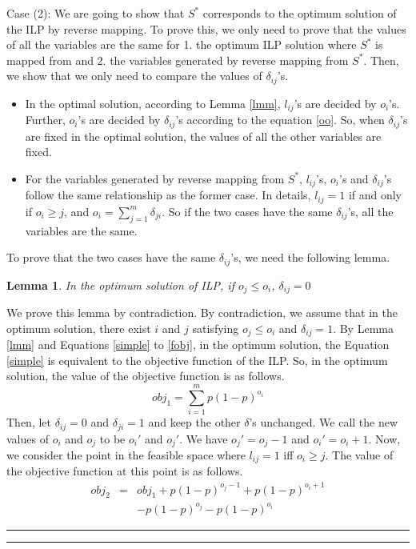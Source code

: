 \documentclass[letterpaper]{article}
\newenvironment{proof}{{Proof:}}{\hfill\rule{2mm}{2mm}}
\newtheorem{lemma}{Lemma}
\begin{document}
\begin{proof}
	Case (2): We are going to show that $S^*$ corresponds to the optimum solution of the ILP by reverse mapping. 
	To prove this, we only need to prove that the values of all the variables are the same for 1. the optimum ILP solution where $S^*$ is mapped from and 2. the variables generated by reverse mapping from $S^*$.
	Then, we show that we only need to compare the values of $\delta_{ij}$'s.
	\begin{itemize}
		\item In the optimal solution, according to Lemma \ref{lmm}, $l_{ij}$'s are decided by $o_i$'s.
		Further, $o_i$'s are decided by $\delta_{ij}$'s according to the equation \ref{oo}.
		So, when $\delta_{ij}$'s are fixed in  the optimal solution, the values of all the other variables are fixed.
		\item For the variables generated by reverse mapping from $S^*$,  $l_{ij}$'s, $o_i$'s and $\delta_{ij}$'s follow the same relationship as the former case. In details, $l_{ij}=1$ if and only if $o_i\geq j$, and $o_i=\sum_{j=1}^{m}\delta_{ji}$. So if the two cases have the same $\delta_{ij}$'s, all the variables are the same.
	\end{itemize}
	To prove that the two cases have the same $\delta_{ij}$'s, we need the following lemma.
	\begin{lemma}\label{lmmcore}
		In the optimum solution of ILP, if $o_j\leq o_i$, $\delta_{ij}=0$
	\end{lemma}
	\begin{proof}
		We prove this lemma by contradiction.
		By contradiction, we assume that in the optimum solution, there exist $i$ and $j$ satisfying $o_j\leq o_i$ and $\delta_{ij}=1$.
		By Lemma \ref{lmm} and Equations \ref{simple} to \ref{fobj}, in the optimum solution, the Equation \ref{simple} is equivalent to the objective function of the ILP.
		So, in the optimum solution, the value of the objective function is as follows.
		\begin{equation}
		obj_1=\sum_{i=1}^m p(1-p)^{o_i}
		\end{equation}
		Then, let $\delta_{ij}=0$ and $\delta_{ji}=1$ and keep the other $\delta$'s unchanged.
		We call the new values of $o_i$ and $o_j$ to be $o_i'$ and $o_j'$.
		We have $o_j'=o_j-1$ and $o_i'=o_i+1$.
		Now, we consider the point in the feasible space where $l_{ij}=1$ iff $o_i\geq j$.
		The value of the objective function at this point is as follows.
		\begin{eqnarray}
		obj_2&=& obj_1+p(1-p)^{o_j-1}+p(1-p)^{o_i+1}\nonumber\\&&-p(1-p)^{o_j}-p(1-p)^{o_i}

\end{eqnarray}
\end{proof}
\end{proof}
\end{document}
